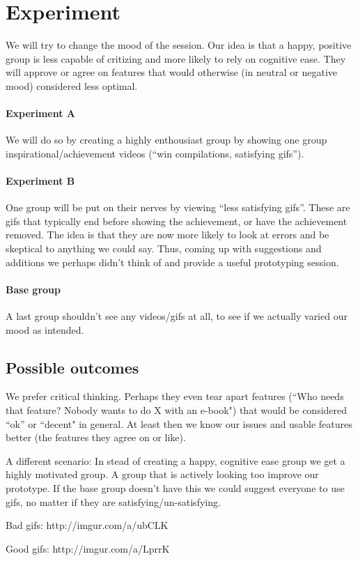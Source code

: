 \section{Experiment}
We will try to change the mood of the session. Our idea is that a happy, positive group is less capable of critizing and more likely to rely on cognitive ease. 
They will approve or agree on features that would otherwise (in neutral or negative mood) considered less optimal. 

\paragraph{Experiment A}
We will do so by creating a highly enthousiast group by showing one group inspirational/achievement videos (``win compilations, satisfying gifs''). 

\paragraph{Experiment B}
One group will be put on their nerves by viewing ``less satisfying gifs''. These are gifs that typically end before showing the achievement, or have the achievement removed. The idea is that they are now more likely to look at errors and be skeptical to anything we could say. Thus, coming up with suggestions and additions we perhaps didn't think of and provide a useful prototyping session. 

\paragraph{Base group}
A last group shouldn't see any videos/gifs at all, to see if we actually varied our mood as intended.


\subsection{Possible outcomes}
We prefer critical thinking. Perhaps they even tear apart features (``Who needs that feature? Nobody wants to do X with an e-book") that would be considered ``ok'' or ``decent" in general. At least then we know our issues and usable features better (the features they agree on or like). 

A different scenario: In stead of creating a happy, cognitive ease group we get a highly motivated group. A group that is actively looking too improve our prototype. If the base group doesn't have this we could suggest everyone to use gifs, no matter if they are satisfying/un-satisfying.


Bad gifs:
http://imgur.com/a/ubCLK

Good gifs:
http://imgur.com/a/LprrK
